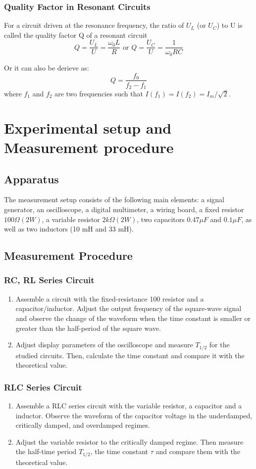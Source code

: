 \documentclass[12pt, a4paper]{article}
\begin{document}
\subsubsection{Quality Factor in Resonant Circuits}
For a circuit driven at the resonance frequency, the ratio of $ U_L $ (or $ U_C $) to U is called the quality factor Q of a resonant circuit
$$ Q=\dfrac{U_L}{U}=\dfrac{\omega_0 L}{R}\text{  or  } Q=\dfrac{U_C}{U}=\dfrac{1}{\omega_0RC} $$

Or it can also be derieve as:
$$ Q=\dfrac{f_0}{f_2-f_1} $$
where $ f_1 $ and $ f_2 $ are two frequencies such that $ I(f_1) = I(f_2) = I_m/\sqrt{2} $.

\section{Experimental setup and Measurement procedure}
\subsection{Apparatus}
The measurement setup consists of the following main elements: a signal generator, 
an oscilloscope, a digital multimeter, a wiring board, a fixed resistor 
$ 100\Omega (2 W) $, a variable resistor $ 2 k\Omega(2 W) $, two capacitors 
$ 0.47 \mu F $ and $ 0.1 \mu F $, as well as two inductors (10 mH and 33 mH).
\subsection{Measurement Procedure}
\subsubsection{RC, RL Series Circuit}
\begin{enumerate}
	\item 
	Assemble a circuit with the fixed-resistance 100 resistor and a capacitor/inductor. 
	Adjust the output frequency of the square-wave signal and observe the change of 
	the waveform when the time constant is smaller or greater than the half-period of 
	the square wave.
	\item 
	Adjust display parameters of the oscilloscope and measure $ T_{1/2} $ for the 
	studied circuits. Then, calculate the time constant and compare it with the 
	theoretical value.
\end{enumerate}
\subsubsection{RLC Series Circuit}
\begin{enumerate}
	\item Assemble a RLC series circuit with the variable resistor, a capacitor and a inductor.
	Observe the waveform of the capacitor voltage in the underdamped, critically damped, and
	overdamped regimes.
	\item Adjust the variable resistor to the critically damped regime. Then measure the half-time period $T_{1/2}$,
	 the time constant $\tau$ and compare them with the theoretical value.
\end{enumerate}
\end{document}
